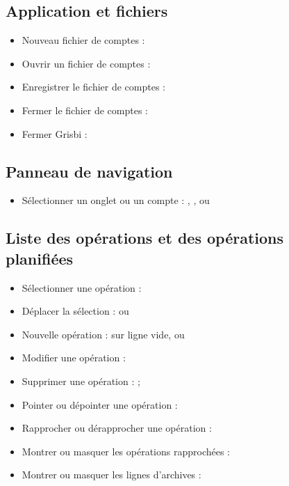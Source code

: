 \subsection{Application et fichiers}

\begin{itemize}
	\item Nouveau fichier de comptes : 
	\item Ouvrir un fichier de comptes : 
	\item Enregistrer le fichier de comptes : 
	\item Fermer le fichier de comptes : 
	\item Fermer Grisbi : 
\end{itemize}


\subsection{Panneau de navigation}

\begin{itemize}
	\item Sélectionner un onglet ou un compte : , ,  ou 
\end{itemize}


\subsection{Liste des opérations et des opérations planifiées}

\begin{itemize}
	\item Sélectionner une opération : 
	\item Déplacer la sélection :  ou 
	\item Nouvelle opération :  sur ligne vide, ou 
	\item Modifier une opération : 
	\item Supprimer une opération :  ;
	\item Pointer ou dépointer une opération : 
	\item Rapprocher ou dérapprocher une opération : 
	\item Montrer ou masquer les opérations rapprochées :  
	\item Montrer ou masquer les lignes d'archives : 
\end{itemize}


